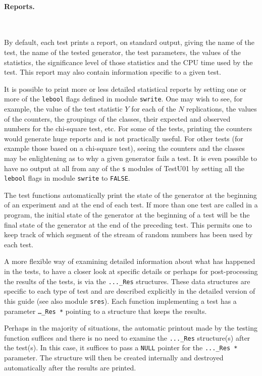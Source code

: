 \paragraph*{Reports.} \

By default, each test prints a report, on standard output,
giving the name of the test, the name of the tested generator,
the test parameters, the values of the statistics,
the significance level of those statistics
and the CPU time used by the test.
This report may also contain information specific to a given test.

It is possible to print more or less detailed statistical reports
by setting one or more of the {\tt lebool} flags defined in module {\tt swrite}. 
One may wish to see, for example, the value of the test 
statistic $Y$ for each of the $N$ replications,
the values of the counters, the groupings of the classes, their
expected and observed numbers for the chi-square test, etc.
For some of the tests, printing the counters would generate huge reports
and is not practically useful. For other tests (for example those
based on a chi-square test), seeing the counters and the classes may be
enlightening as to why a given generator fails a test.
It is even possible to have no output at all from any of the {\tt s} 
modules of TestU01 by setting all the {\tt lebool} flags in module {\tt swrite} 
 to {\tt FALSE}.

The test functions automatically print the state of the generator
at the beginning of an experiment and at the end of each test.
If more than one test are called in a program, the initial state
of the generator at the beginning of a test will be the final state
of the generator at the end of the preceding test. This permits one to
keep track of which segment of the stream of random numbers has been
used by each test.

A more flexible way of examining detailed information
about what has happened in the tests, to have a closer look at 
specific details or perhaps for post-processing the results of the tests,
is via the {\tt ...\_Res} structures.
These data structures are specific to each type of test and
are described explicitly in the detailed version of this guide
(see also module {\tt sres}).
Each function implementing a test has a parameter {\tt \ldots\_Res *}
pointing to a structure that keeps the results.  

Perhaps in the majority of situations, the automatic printout made
by the testing function suffices and there is no need to 
examine the {\tt ...\_Res} structure(s) after the test(s).
In this case, it suffices to pass 
a {\tt NULL} pointer for the {\tt ...\_Res *} parameter.
The structure will then be created internally and destroyed automatically
after the results are printed.


